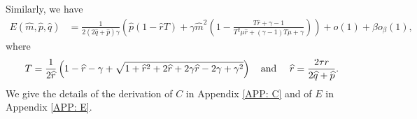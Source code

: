 \documentclass[9pt,twocolumn]{pnas-new}
\begin{document}
Similarly, we have
\begin{equation}\label{eqn: E}
\begin{aligned}
    E(\widehat{m},\widehat{p},\widehat{q})& = \frac{1}{2(2\widehat{q}+\widehat{p}) \gamma} \left(\widehat{p}\left(1- \widehat{r}T\right)+\gamma \widehat{m}^2 \left(1-\frac{T\widehat{r}+\gamma-1}{T^2 \mu \widehat{r} +(\gamma -1) T \mu +\gamma}\right) \right)+o(1)+\beta o_\beta(1),
\end{aligned}
\end{equation}
where
\begin{equation}
    T=\frac{1}{2\widehat{r}}\left(1-\widehat{r}-\gamma+\sqrt{1+\widehat{r}^{2}+2\widehat{r}+2\gamma \widehat{r}-2\gamma+\gamma^{2}}\right) \text{\quad and \quad} \widehat{r}=\frac{2\tau r}{2\widehat{q}+\widehat{p}}.
\end{equation}
We give the details of the derivation of $C$ in Appendix \ref{APP: C} and of $E$ in Appendix \ref{APP: E}. 
\end{document}
